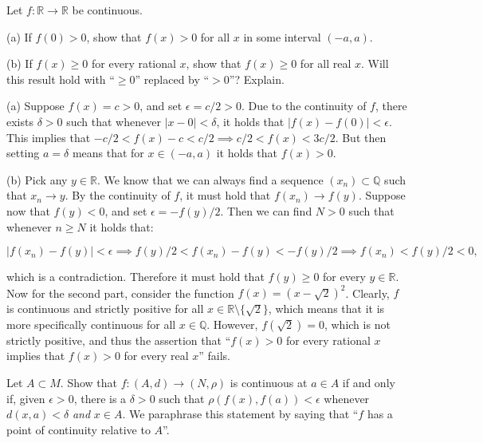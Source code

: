 \begin{exercise}{8}
    Let $f: \mathbb{R} \rightarrow \mathbb{R}$ be continuous.

    (a) If $f(0) > 0$, show that $f(x) > 0$ for all $x$ in some interval $(-a, a)$.

    (b) If $f(x) \geq 0$ for every rational $x$, show that $f(x) \geq 0$ for all real $x$.
    Will this result hold with ``$\geq 0$'' replaced by ``$> 0$''?
    Explain.
\end{exercise}

\begin{solution}
    
    (a) Suppose $f(x) = c > 0$, and set $\epsilon = c/2 > 0$.
    Due to the continuity of $f$, there exists $\delta > 0$ such that whenever $\lvert x - 0 \rvert < \delta$, it holds that $\lvert f(x) - f(0) \rvert < \epsilon$.
    This implies that $-c/2 < f(x) - c < c/2 \implies c/2 < f(x) < 3c/2$.
    But then setting $a = \delta$ means that for $x \in (-a, a)$ it holds that $f(x) > 0$.

    (b) Pick any $y \in \mathbb{R}$.
    We know that we can always find a sequence $(x_n) \subset \mathbb{Q}$ such that $x_n \rightarrow y$.
    By the continuity of $f$, it must hold that $f(x_n) \rightarrow f(y)$.
    Suppose now that $f(y) < 0$, and set $\epsilon = -f(y)/2$.
    Then we can find $N > 0$ such that whenever $n \geq N$ it holds that:

    \[\lvert f(x_n) - f(y) \rvert < \epsilon \implies f(y)/2 < f(x_n) - f(y) < -f(y)/2 \implies f(x_n) < f(y)/2 < 0,\]

    which is a contradiction.
    Therefore it must hold that $f(y) \geq 0$ for every $y \in \mathbb{R}$.
    Now for the second part, consider the function $f(x) = (x - \sqrt{2})^2$.
    Clearly, $f$ is continuous and strictly positive for all $x \in \mathbb{R} \setminus \{\sqrt{2}\}$, which means that it is more specifically continuous for all $x \in \mathbb{Q}$.
    However, $f(\sqrt{2}) = 0$, which is not strictly positive, and thus the assertion that ``$f(x) > 0$ for every rational $x$ implies that $f(x) > 0$ for every real $x$'' fails.
\end{solution}

\begin{exercise}{9}
    Let $A \subset M$.
    Show that $f: (A, d) \rightarrow (N, \rho)$ is continuous at $a \in A$ if and only if, given $\epsilon > 0$, there is a $\delta > 0$ such that $\rho(f(x), f(a)) < \epsilon$ whenever $d(x, a) < \delta$ \textit{and} $x \in A$.
    We paraphrase this statement by saying that ``$f$ has a point of continuity relative to $A$''.
\end{exercise}

